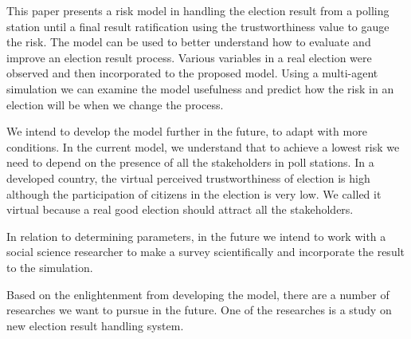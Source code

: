 \documentclass[JIP]{ipsj}
\begin{document}
This paper presents a risk model in handling the election result from a polling station until a final result ratification using the trustworthiness value to gauge the risk. The model can be used to better understand how to evaluate and improve an election result process. Various variables in a real election were observed and then incorporated to the proposed model. Using a multi-agent simulation we can examine the model usefulness and predict how the risk in an election will be when we change the process.

We intend to develop the model further in the future, to adapt with more conditions. In the current model, we understand that to achieve a lowest risk we need to depend on the presence of all the stakeholders in poll stations. In a developed country, the virtual perceived trustworthiness of election is high although the participation of citizens in the election is very low. We called it virtual because a real good election should attract all the stakeholders.

In relation to determining parameters, in the future we intend to work with a social science researcher to make a survey scientifically and incorporate the result to the simulation.

Based on the enlightenment from developing the model, there are a number of researches we want to pursue in the future. One of the researches is a study on new election result handling system.


{}


\begin{biography}

%
%
%
\end{biography}
\end{document}
